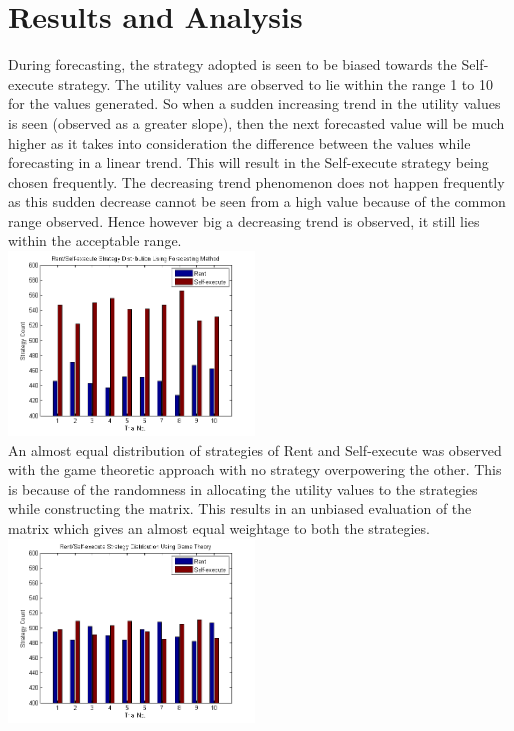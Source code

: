 \documentclass[conference]{IEEEtran}
\begin{document}
\section{Results and Analysis}
During forecasting, the strategy adopted is seen to be biased towards the Self-execute strategy. The utility values are observed to lie within the range 1 to 10 for the values generated. So when a sudden increasing trend in the utility values is seen (observed as a greater slope), then the next forecasted value will be much higher as it takes into consideration the difference between the values while forecasting in a linear trend. This will result in the Self-execute strategy being chosen frequently. The decreasing trend phenomenon does not happen frequently as this sudden decrease cannot be seen from a high value because of the common range observed. Hence however big a decreasing trend is observed, it still lies within the acceptable range. \\[0.3cm]
\includegraphics[width=0.49\textwidth]{forecasting1}\\[0.3cm]
An almost equal distribution of strategies of Rent and Self-execute was observed with the game theoretic approach with no strategy overpowering the other. This is because of the randomness in allocating the utility values to the strategies while constructing the matrix. This results in an unbiased evaluation of the matrix which gives an almost equal weightage to both the strategies.\\[0.3cm]
\includegraphics[width=0.49\textwidth]{Gametheory}\\[0.3cm]
\end{document}

